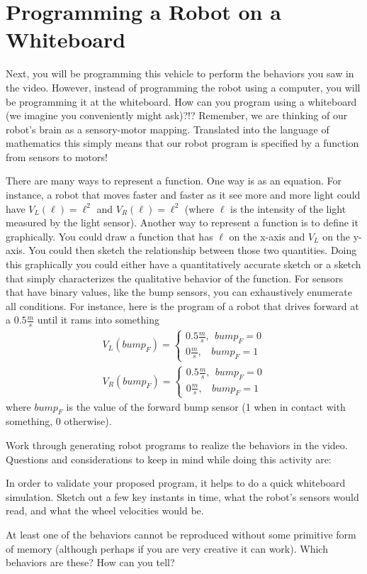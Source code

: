 \documentclass{tufte-handout}
\begin{document}
\section{Programming a Robot on a Whiteboard}
Next, you will be programming this vehicle to perform the behaviors you saw in the video.  However, instead of programming the robot using a computer, you will be programming it at the whiteboard.  How can you program using a whiteboard (we imagine you conveniently might ask)?!?  Remember, we are thinking of our robot's brain as a sensory-motor mapping.  Translated into the language of mathematics this simply means that our robot program is specified by a function from sensors to motors!

There are many ways to represent a function.  One way is as an equation.  For instance, a robot that moves faster and faster as it see more and more light could have $V_L(\ell) = \ell^2$ and $V_R(\ell) = \ell^2$ (where $\ell$ is the intensity of the light measured by the light sensor).  Another way to represent a function is to define it graphically.  You could draw a function that has $\ell$ on the x-axis and $V_L$ on the y-axis.  You could then sketch the relationship between those two quantities.  Doing this graphically you could either have a quantitatively accurate sketch or a sketch that simply characterizes the qualitative behavior of the function.  For sensors that have binary values, like the bump sensors, you can exhaustively enumerate all conditions.  For instance, here is the program of a robot that drives forward at a $0.5 \frac{m}{s}$ until it rams into something
\begin{align}
V_L(bump_F) = \begin{cases} 0.5 \frac{m}{s},  ~~bump_F = 0   \\ 0\frac{m}{s}, ~~~~bump_F = 1\end{cases} \nonumber \\
V_R(bump_F) = \begin{cases} 0.5 \frac{m}{s},  ~~bump_F = 0 \\ 0\frac{m}{s}, ~~~~bump_F  = 1\end{cases} \nonumber
\end{align}
where $bump_F$ is the value of the forward bump sensor (1 when in contact with something, 0 otherwise).

\be[resume=exercises, label=\textbf{Exercise} (\arabic*)]
\item Work through generating robot programs to realize the behaviors in the video.  Questions and considerations to keep in mind while doing this activity are:
\be
\item In order to validate your proposed program, it helps to do a quick whiteboard simulation.  Sketch out a few key instants in time, what the robot's sensors would read, and what the wheel velocities would be.
\item At least one of the behaviors cannot be reproduced without some primitive form of memory (although perhaps if you are very creative it can work).  Which behaviors are these?  How can you tell?
\ee
\ee
\end{document}
